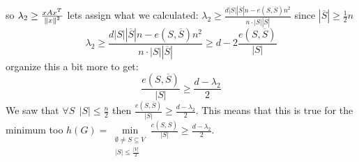 \begin{thm}
so $\lambda_{2}\ge\frac{xAx^{T}}{\left\Vert x\right\Vert^{2}}$ lets assign what we
calculated: $\lambda_{2}\ge\frac{d\left|S\right|\left|\overline{S}\right|n-e\left(S,\overline{S}\right)n^{2}}{n\cdot\left|S\right|\left|\overline{S}\right|}$
since $\left|\overline{S}\right|\ge\frac{1}{2}n$ 
\[
\lambda_{2}\ge\frac{d\left|S\right|\left|\overline{S}\right|n-e\left(S,\overline{S}\right)n^{2}}{n\cdot\left|S\right|\left|\overline{S}\right|}\ge d-2\frac{e\left(S,\overline{S}\right)}{\left|S\right|}
\]
organize this a bit more to get: 
\[
\frac{e\left(S,\overline{S}\right)}{\left|S\right|}\ge\frac{d-\lambda_{2}}{2}
\]
We saw that $\forall S\,\;\left|S\right|\le\frac{n}{2}$ then $\frac{e\left(S,\overline{S}\right)}{\left|S\right|}\ge\frac{d-\lambda_{2}}{2}$.
This means that this is true for the minimum too $h\left(G\right)=\min\limits _{\begin{array}{c}
\emptyset\ne S\subseteq V\\
\left|S\right|\le\frac{\left|V\right|}{2}
\end{array}}\frac{e\left(S,\overline{S}\right)}{\left|S\right|}\ge\frac{d-\lambda_{2}}{2}$. 
\end{thm}

